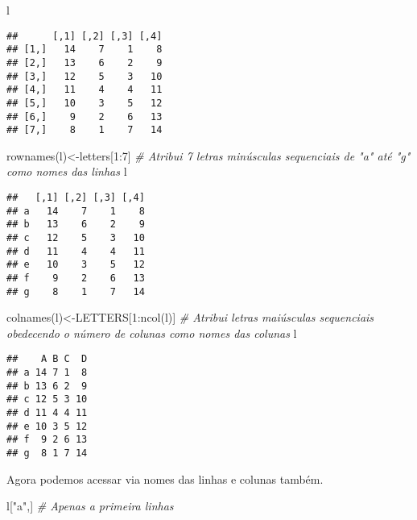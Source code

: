 \documentclass[
]{book}
\newenvironment{Shaded}{\begin{snugshade}}{\end{snugshade}}
\newcommand{\CommentTok}[1]{\textcolor[rgb]{0.56,0.35,0.01}{\textit{#1}}}
\newcommand{\DecValTok}[1]{\textcolor[rgb]{0.00,0.00,0.81}{#1}}
\newcommand{\FunctionTok}[1]{\textcolor[rgb]{0.00,0.00,0.00}{#1}}
\newcommand{\NormalTok}[1]{#1}
\newcommand{\OtherTok}[1]{\textcolor[rgb]{0.56,0.35,0.01}{#1}}
\newcommand{\SpecialCharTok}[1]{\textcolor[rgb]{0.00,0.00,0.00}{#1}}
\newcommand{\StringTok}[1]{\textcolor[rgb]{0.31,0.60,0.02}{#1}}
\begin{document}
\begin{Shaded}
\begin{Highlighting}[]
\NormalTok{l}
\end{Highlighting}
\end{Shaded}

\begin{verbatim}
##      [,1] [,2] [,3] [,4]
## [1,]   14    7    1    8
## [2,]   13    6    2    9
## [3,]   12    5    3   10
## [4,]   11    4    4   11
## [5,]   10    3    5   12
## [6,]    9    2    6   13
## [7,]    8    1    7   14
\end{verbatim}

\begin{Shaded}
\begin{Highlighting}[]
\FunctionTok{rownames}\NormalTok{(l)}\OtherTok{\textless{}{-}}\NormalTok{letters[}\DecValTok{1}\SpecialCharTok{:}\DecValTok{7}\NormalTok{] }\CommentTok{\# Atribui 7 letras minúsculas sequenciais de "a" até "g" como nomes das linhas}
\NormalTok{l}
\end{Highlighting}
\end{Shaded}

\begin{verbatim}
##   [,1] [,2] [,3] [,4]
## a   14    7    1    8
## b   13    6    2    9
## c   12    5    3   10
## d   11    4    4   11
## e   10    3    5   12
## f    9    2    6   13
## g    8    1    7   14
\end{verbatim}

\begin{Shaded}
\begin{Highlighting}[]
\FunctionTok{colnames}\NormalTok{(l)}\OtherTok{\textless{}{-}}\NormalTok{LETTERS[}\DecValTok{1}\SpecialCharTok{:}\FunctionTok{ncol}\NormalTok{(l)] }\CommentTok{\# Atribui letras maiúsculas sequenciais obedecendo o número de colunas como nomes das colunas}
\NormalTok{l}
\end{Highlighting}
\end{Shaded}

\begin{verbatim}
##    A B C  D
## a 14 7 1  8
## b 13 6 2  9
## c 12 5 3 10
## d 11 4 4 11
## e 10 3 5 12
## f  9 2 6 13
## g  8 1 7 14
\end{verbatim}

Agora podemos acessar via nomes das linhas e colunas também.

\begin{Shaded}
\begin{Highlighting}[]
\NormalTok{l[}\StringTok{"a"}\NormalTok{,] }\CommentTok{\# Apenas a primeira linhas}
\end{Highlighting}
\end{Shaded}
\end{document}
